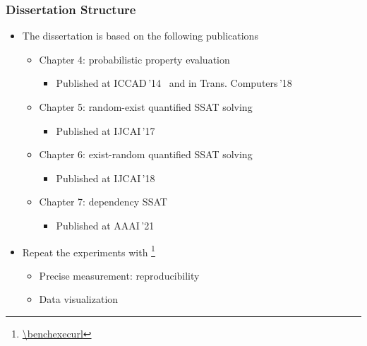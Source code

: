 \begin{frame}
      \frametitle{Dissertation Structure}
      \begin{itemize}
            \item The dissertation is based on the following publications
                  \begin{itemize}
                        \item Chapter 4: probabilistic property evaluation
                              \begin{itemize}
                                    \item Published at ICCAD\,'14~\cite{LeeICCAD14ProbDesign} and in Trans. Computers\,'18~\cite{LeeTC18ProbDesign}
                              \end{itemize}
                        \item Chapter 5: random-exist quantified SSAT solving
                              \begin{itemize}
                                    \item Published at IJCAI\,'17~\cite{LeeIJCAI17RESSAT}
                              \end{itemize}
                        \item Chapter 6: exist-random quantified SSAT solving
                              \begin{itemize}
                                    \item Published at IJCAI\,'18~\cite{LeeIJCAI18ERSSAT}
                              \end{itemize}
                        \item Chapter 7: dependency SSAT
                              \begin{itemize}
                                    \item Published at AAAI\,'21~\cite{LeeAAAI21DSSAT}
                              \end{itemize}
                  \end{itemize}
                  \pause
            \item Repeat the experiments with \benchexec\footnote{\url{\benchexecurl}}
                  \begin{itemize}
                        \item Precise measurement: reproducibility
                        \item Data visualization
                  \end{itemize}
      \end{itemize}
\end{frame}